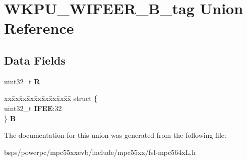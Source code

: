 \hypertarget{unionWKPU__WIFEER__32B__tag}{}\section{W\+K\+P\+U\+\_\+\+W\+I\+F\+E\+E\+R\+\_\+B\+\_\+tag Union Reference}
\label{unionWKPU__WIFEER__32B__tag}
\subsection*{Data Fields}
\begin{DoxyCompactItemize}
\item 
\mbox{\label{unionWKPU__WIFEER__32B__tag_a358785200738b200832e490155c0fd04}} 
uint32\+\_\+t {\bfseries R}
\item 
\mbox{\label{unionWKPU__WIFEER__32B__tag_a181b2400191dafd4911204aef29c2acc}} 
\begin{tabbing}
xx\=xx\=xx\=xx\=xx\=xx\=xx\=xx\=xx\=\kill
struct \{\\
\>uint32\_t {\bfseries IFEE}:32\\
\} {\bfseries B}\\

\end{tabbing}\end{DoxyCompactItemize}


The documentation for this union was generated from the following file\+:\begin{DoxyCompactItemize}
\item 
bsps/powerpc/mpc55xxevb/include/mpc55xx/fsl-\/mpc564x\+L.\+h\end{DoxyCompactItemize}
